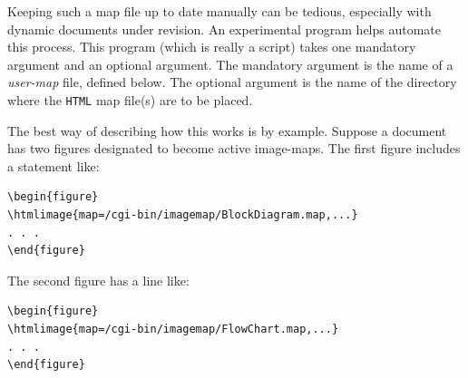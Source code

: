 %
\html{\\}%

Keeping such a map file up to date manually can be tedious, 
especially with dynamic documents under revision.
An experimental program  helps automate this process.  
This program (which is really a \Perl{} script)
takes one mandatory argument and an optional argument.
The mandatory argument is the name of a \emph{user-map} file,
defined below.  The optional argument is the name of the
directory where the \texttt{HTML} map file(s) are to be placed.

\html{\\}%
The best way of describing how this works is by example.
Suppose a document has two figures designated to
become active image-maps.  The first
figure includes a statement like:
\begin{small}
\begin{verbatim}
\begin{figure}
\htmlimage{map=/cgi-bin/imagemap/BlockDiagram.map,...}
. . .
\end{figure}
\end{verbatim}
\end{small}
The second figure has a line like:

\begin{small}
\begin{verbatim}
\begin{figure}
\htmlimage{map=/cgi-bin/imagemap/FlowChart.map,...}
. . .
\end{figure}
\end{verbatim}
\end{small}

